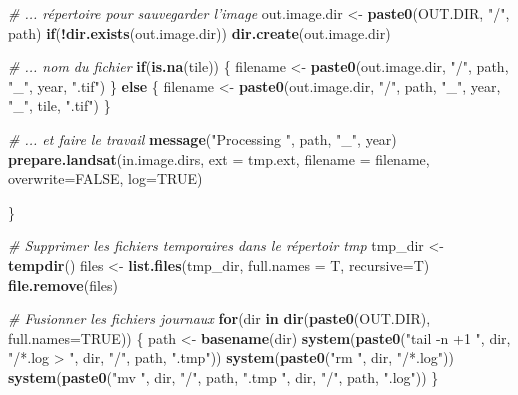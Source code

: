 \documentclass[a4paper, notitlepage, 12pt, krantz2]{krantz}
\newenvironment{Shaded}{\begin{snugshade}}{\end{snugshade}}
\newcommand{\CommentTok}[1]{\textcolor[rgb]{0.56,0.35,0.01}{\textit{#1}}}
\newcommand{\ControlFlowTok}[1]{\textcolor[rgb]{0.13,0.29,0.53}{\textbf{#1}}}
\newcommand{\DataTypeTok}[1]{\textcolor[rgb]{0.13,0.29,0.53}{#1}}
\newcommand{\KeywordTok}[1]{\textcolor[rgb]{0.13,0.29,0.53}{\textbf{#1}}}
\newcommand{\NormalTok}[1]{#1}
\newcommand{\OperatorTok}[1]{\textcolor[rgb]{0.81,0.36,0.00}{\textbf{#1}}}
\newcommand{\OtherTok}[1]{\textcolor[rgb]{0.56,0.35,0.01}{#1}}
\newcommand{\StringTok}[1]{\textcolor[rgb]{0.31,0.60,0.02}{#1}}
\begin{document}
\begin{Shaded}
\begin{Highlighting}[]
{  \CommentTok{# ... répertoire pour sauvegarder l'image}
\NormalTok{  out.image.dir <-}\StringTok{ }\KeywordTok{paste0}\NormalTok{(OUT.DIR, }\StringTok{"/"}\NormalTok{, path)}
  \ControlFlowTok{if}\NormalTok{(}\OperatorTok{!}\KeywordTok{dir.exists}\NormalTok{(out.image.dir)) }\KeywordTok{dir.create}\NormalTok{(out.image.dir)}
  
  \CommentTok{# ... nom du fichier}
  \ControlFlowTok{if}\NormalTok{(}\KeywordTok{is.na}\NormalTok{(tile)) \{}
\NormalTok{    filename <-}\StringTok{ }\KeywordTok{paste0}\NormalTok{(out.image.dir, }\StringTok{"/"}\NormalTok{, path, }\StringTok{"_"}\NormalTok{, year, }\StringTok{".tif"}\NormalTok{)}
\NormalTok{  \} }\ControlFlowTok{else}\NormalTok{ \{}
\NormalTok{    filename <-}\StringTok{ }\KeywordTok{paste0}\NormalTok{(out.image.dir, }\StringTok{"/"}\NormalTok{, path, }\StringTok{"_"}\NormalTok{, year, }\StringTok{"_"}\NormalTok{, tile, }\StringTok{".tif"}\NormalTok{)}
\NormalTok{  \}}
  
  \CommentTok{# ... et faire le travail}
  \KeywordTok{message}\NormalTok{(}\StringTok{"Processing "}\NormalTok{, path, }\StringTok{"_"}\NormalTok{, year)}
  \KeywordTok{prepare.landsat}\NormalTok{(in.image.dirs, }
                  \DataTypeTok{ext =}\NormalTok{ tmp.ext, }
                  \DataTypeTok{filename =}\NormalTok{ filename, }
                  \DataTypeTok{overwrite=}\OtherTok{FALSE}\NormalTok{, }
                  \DataTypeTok{log=}\OtherTok{TRUE}\NormalTok{)}
  
\NormalTok{\}}

\CommentTok{# Supprimer les fichiers temporaires dans le répertoir tmp}
\NormalTok{tmp_dir <-}\StringTok{ }\KeywordTok{tempdir}\NormalTok{()}
\NormalTok{files <-}\StringTok{ }\KeywordTok{list.files}\NormalTok{(tmp_dir, }\DataTypeTok{full.names =}\NormalTok{ T, }\DataTypeTok{recursive=}\NormalTok{T)}
\KeywordTok{file.remove}\NormalTok{(files)}

\CommentTok{# Fusionner les fichiers journaux }
\ControlFlowTok{for}\NormalTok{(dir }\ControlFlowTok{in} \KeywordTok{dir}\NormalTok{(}\KeywordTok{paste0}\NormalTok{(OUT.DIR), }\DataTypeTok{full.names=}\OtherTok{TRUE}\NormalTok{)) \{}
\NormalTok{  path <-}\StringTok{ }\KeywordTok{basename}\NormalTok{(dir)}
  \KeywordTok{system}\NormalTok{(}\KeywordTok{paste0}\NormalTok{(}\StringTok{"tail -n +1 "}\NormalTok{, dir, }\StringTok{"/*.log > "}\NormalTok{, dir, }\StringTok{"/"}\NormalTok{, path, }\StringTok{".tmp"}\NormalTok{))}
  \KeywordTok{system}\NormalTok{(}\KeywordTok{paste0}\NormalTok{(}\StringTok{"rm "}\NormalTok{, dir, }\StringTok{"/*.log"}\NormalTok{))}
  \KeywordTok{system}\NormalTok{(}\KeywordTok{paste0}\NormalTok{(}\StringTok{"mv "}\NormalTok{, dir, }\StringTok{"/"}\NormalTok{, path, }\StringTok{".tmp "}\NormalTok{, dir, }\StringTok{"/"}\NormalTok{, path, }\StringTok{".log"}\NormalTok{))}
\NormalTok{\}}


}
\end{Highlighting}
\end{Shaded}
\end{document}
